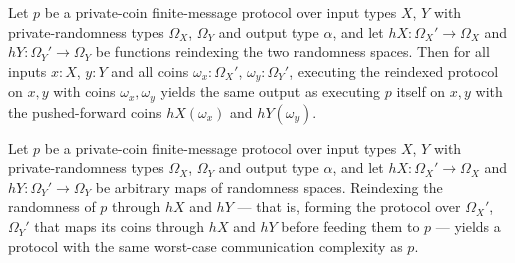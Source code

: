 \begin{theorem}
\label{CommunicationComplexity.PrivateCoin.FiniteMessage.Protocol.comapRandomness_rrun}
\leanok
{}
Let $p$ be a private-coin finite-message protocol over input types $X$, $Y$ with
private-randomness types $\Omega_X$, $\Omega_Y$ and output type $\alpha$, and let $hX :
\Omega_X' \to \Omega_X$ and $hY : \Omega_Y' \to \Omega_Y$ be functions reindexing the
two randomness spaces. Then for all inputs $x : X$, $y : Y$ and all coins $\omega_x :
\Omega_X'$, $\omega_y : \Omega_Y'$, executing the reindexed protocol on $x, y$ with
coins $\omega_x, \omega_y$ yields the same output as executing $p$ itself on $x, y$ with
the pushed-forward coins $hX(\omega_x)$ and $hY(\omega_y)$.
\end{theorem}

\begin{theorem}
\label{CommunicationComplexity.PrivateCoin.FiniteMessage.Protocol.comapRandomness_complexity}
\leanok
{}
Let $p$ be a private-coin finite-message protocol over input types $X$, $Y$ with
private-randomness types $\Omega_X$, $\Omega_Y$ and output type $\alpha$, and let $hX :
\Omega_X' \to \Omega_X$ and $hY : \Omega_Y' \to \Omega_Y$ be arbitrary maps of
randomness spaces. Reindexing the randomness of $p$ through $hX$ and $hY$ — that is,
forming the protocol over $\Omega_X'$, $\Omega_Y'$ that maps its coins through $hX$ and
$hY$ before feeding them to $p$ — yields a protocol with the same worst-case
communication complexity as $p$.
\end{theorem}

